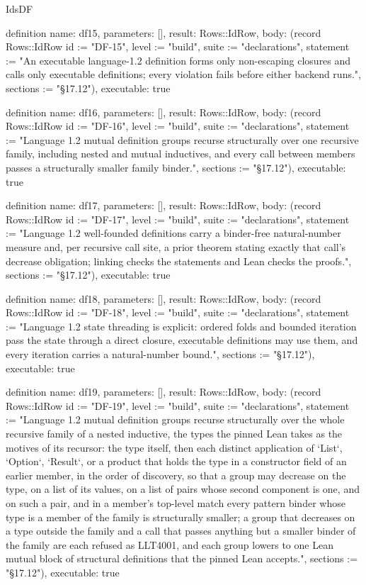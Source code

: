 \begin{lexlean}{IdsDF}
\begin{semanticmodule}
definition{
  name: df15,
  parameters: [],
  result: Rows::IdRow,
  body: (record Rows::IdRow {id := "DF-15", level := "build", suite := "declarations", statement := "An executable language-1.2 definition forms only non-escaping closures and calls only executable definitions; every violation fails before either backend runs.", sections := "§17.12"}),
  executable: true
}

definition{
  name: df16,
  parameters: [],
  result: Rows::IdRow,
  body: (record Rows::IdRow {id := "DF-16", level := "build", suite := "declarations", statement := "Language 1.2 mutual definition groups recurse structurally over one recursive family, including nested and mutual inductives, and every call between members passes a structurally smaller family binder.", sections := "§17.12"}),
  executable: true
}

definition{
  name: df17,
  parameters: [],
  result: Rows::IdRow,
  body: (record Rows::IdRow {id := "DF-17", level := "build", suite := "declarations", statement := "Language 1.2 well-founded definitions carry a binder-free natural-number measure and, per recursive call site, a prior theorem stating exactly that call's decrease obligation; linking checks the statements and Lean checks the proofs.", sections := "§17.12"}),
  executable: true
}

definition{
  name: df18,
  parameters: [],
  result: Rows::IdRow,
  body: (record Rows::IdRow {id := "DF-18", level := "build", suite := "declarations", statement := "Language 1.2 state threading is explicit: ordered folds and bounded iteration pass the state through a direct closure, executable definitions may use them, and every iteration carries a natural-number bound.", sections := "§17.12"}),
  executable: true
}

definition{
  name: df19,
  parameters: [],
  result: Rows::IdRow,
  body: (record Rows::IdRow {id := "DF-19", level := "build", suite := "declarations", statement := "Language 1.2 mutual definition groups recurse structurally over the whole recursive family of a nested inductive, the types the pinned Lean takes as the motives of its recursor: the type itself, then each distinct application of `List`, `Option`, `Result`, or a product that holds the type in a constructor field of an earlier member, in the order of discovery, so that a group may decrease on the type, on a list of its values, on a list of pairs whose second component is one, and on such a pair, and in a member's top-level match every pattern binder whose type is a member of the family is structurally smaller; a group that decreases on a type outside the family and a call that passes anything but a smaller binder of the family are each refused as LLT4001, and each group lowers to one Lean mutual block of structural definitions that the pinned Lean accepts.", sections := "§17.12"}),
  executable: true
}
\end{semanticmodule}
\end{lexlean}
